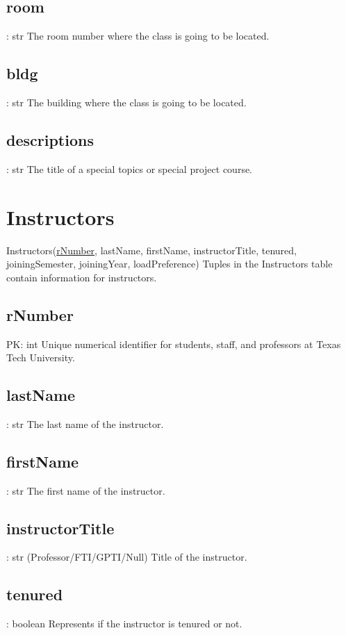 	\subsection{room}
		: str
		The room number where the class is going to be located.
		    	
	\subsection{bldg}
		: str
		The building where the class is going to be located.
		
	\subsection{descriptions}
		: str
		The title of a special topics or special project course.
		    


\section{Instructors}
	Instructors(\underline{rNumber}, lastName, firstName, instructorTitle, tenured, joiningSemester, joiningYear, loadPreference) 
		Tuples in the Instructors table contain information for instructors.
	
	\subsection{rNumber}
		PK: int
		Unique numerical identifier for students, staff, and professors at Texas Tech University.
    
    \subsection{lastName}
		: str  
    	The last name of the instructor.
    
    \subsection{firstName}
    	: str 
    	The first name of the instructor.
  
    \subsection{instructorTitle}
    	: str (Professor/FTI/GPTI/Null)
    	Title of the instructor.
    
    \subsection{tenured}    
    	: boolean 
    	Represents if the instructor is tenured or not.
    
